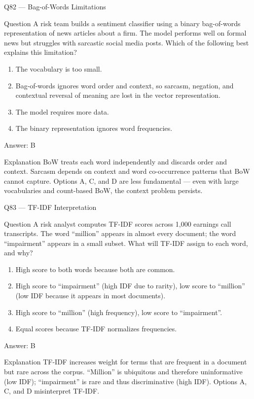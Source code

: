 \documentclass[aspectratio=169,8pt]{beamer}
\begin{document}
\begin{frame}{Q82 --- Bag-of-Words Limitations}
\begin{block}{Question}
A risk team builds a sentiment classifier using a binary bag-of-words representation of news articles about a firm. The model performs well on formal news but struggles with sarcastic social media posts. Which of the following best explains this limitation?
\end{block}
\begin{enumerate}
\item The vocabulary is too small.
\item Bag-of-words ignores word order and context, so sarcasm, negation, and contextual reversal of meaning are lost in the vector representation.
\item The model requires more data.
\item The binary representation ignores word frequencies.
\end{enumerate}
\begin{exampleblock}{Answer: B}\end{exampleblock}
\begin{block}{Explanation}
BoW treats each word independently and discards order and context. Sarcasm depends on context and word co-occurrence patterns that BoW cannot capture. Options A, C, and D are less fundamental --- even with large vocabularies and count-based BoW, the context problem persists.
\end{block}
\end{frame}

\begin{frame}{Q83 --- TF-IDF Interpretation}
\begin{block}{Question}
A risk analyst computes TF-IDF scores across 1,000 earnings call transcripts. The word ``million'' appears in almost every document; the word ``impairment'' appears in a small subset. What will TF-IDF assign to each word, and why?
\end{block}
\begin{enumerate}
\item High score to both words because both are common.
\item High score to ``impairment'' (high IDF due to rarity), low score to ``million'' (low IDF because it appears in most documents).
\item High score to ``million'' (high frequency), low score to ``impairment''.
\item Equal scores because TF-IDF normalizes frequencies.
\end{enumerate}
\begin{exampleblock}{Answer: B}\end{exampleblock}
\begin{block}{Explanation}
TF-IDF increases weight for terms that are frequent in a document but rare across the corpus. ``Million'' is ubiquitous and therefore uninformative (low IDF); ``impairment'' is rare and thus discriminative (high IDF). Options A, C, and D misinterpret TF-IDF.
\end{block}
\end{frame}
\end{document}
